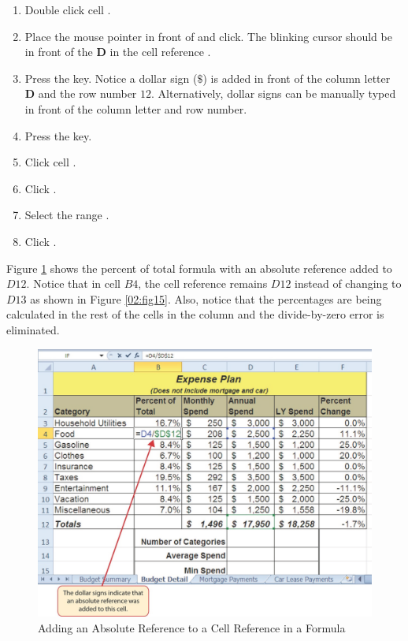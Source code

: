 \begin{enumbox}
	\begin{enumerate}
		\item Double click cell .
		\item Place the mouse pointer in front of  and click. The blinking cursor should be in front of the \textbf{D} in the cell reference .
		\item Press the  key. Notice a dollar sign ($ \$ $) is added in front of the column letter \textbf{D} and the row number \textbf{$ 12 $}. Alternatively, dollar signs can be manually typed in front of the column letter and row number.
		\item Press the  key.
		\item Click cell .
		\item Click .
		\item Select the range .
		\item Click .
	\end{enumerate}
\end{enumbox}

Figure \ref{02:fig16} shows the percent of total formula with an absolute reference added to $ D12 $. Notice that in cell $ B4 $, the cell reference remains $ D12 $ instead of changing to $ D13 $ as shown in Figure \ref{02:fig15}. Also, notice that the percentages are being calculated in the rest of the cells in the column and the divide-by-zero error is eliminated.

\begin{figure}[H]
	\centering
	\includegraphics[width=\maxwidth{.95\linewidth}]{gfx/ch02_fig16}
	\caption{Adding an Absolute Reference to a Cell Reference in a Formula}
	\label{02:fig16}
\end{figure}


